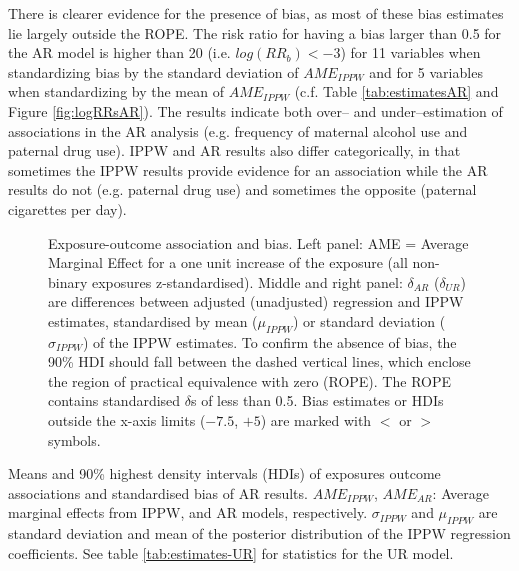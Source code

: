 \documentclass[12pt]{article}
\begin{document}
There is clearer evidence for the presence of bias, as most of these bias estimates lie largely outside the ROPE. The risk ratio for having a bias larger than 0.5 for the AR model is higher than 20 (i.e. $log(RR_b) < -3$) for 11 variables when standardizing bias by the standard deviation of $AME_{IPPW}$ and for 5 variables when standardizing by the mean of $AME_{IPPW}$ (c.f. Table  \ref{tab:estimatesAR} and Figure \ref{fig:logRRsAR}). The results indicate both over-- and under--estimation of associations in the AR analysis (e.g. frequency of maternal alcohol use and paternal drug use). IPPW and AR results also differ categorically, in that sometimes the IPPW results provide evidence for an association while the AR results do not (e.g. paternal drug use) and sometimes the opposite (paternal cigarettes per day). 

\begin{figure}
	\centering
	\caption{Exposure-outcome association and bias. Left panel: AME = Average Marginal Effect for a one unit increase of the exposure (all non-binary exposures z-standardised). 
	Middle and right panel: $\delta_{AR}$ ($\delta_{UR}$) are differences between adjusted (unadjusted) regression and IPPW estimates, standardised by mean ($\mu_{IPPW}$) or standard deviation ($\sigma_{IPPW}$) of the IPPW estimates. To confirm the absence of bias, the 90\% HDI should fall between the dashed vertical lines, which enclose the region of practical equivalence with zero (ROPE). The ROPE contains standardised $\delta$s of less than 0.5. Bias estimates or HDIs outside the x-axis limits ($-7.5$, $+5$) are marked with $<$ or $>$  symbols.}
\label{fig:estimates}
\end{figure}

\begin{sidewaystable}
	\caption{Means and 90\% highest density intervals (HDIs) of exposures outcome associations and standardised bias of AR results. $AME_{IPPW}$, $AME_{AR}$: Average marginal effects from IPPW, and AR models, respectively. $\sigma_{IPPW}$ and $\mu_{IPPW}$ are standard deviation and mean of the posterior distribution of the IPPW regression coefficients. See table \ref{tab:estimates-UR} for statistics for the UR model.} 
	\label{tab:estimatesAR}
\end{sidewaystable}
\end{document}
